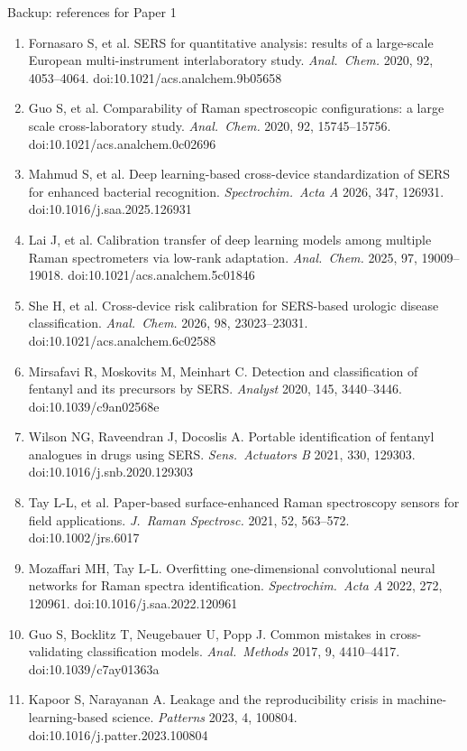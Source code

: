 \documentclass[aspectratio=169,10pt]{beamer}
\begin{document}
\begin{frame}{Backup: references for Paper 1}
\tiny
\begin{enumerate}\setlength{\itemsep}{0pt}
  \item Fornasaro S, et al. SERS for quantitative analysis: results of a large-scale European multi-instrument interlaboratory study. \emph{Anal.\ Chem.} 2020, 92, 4053--4064. doi:10.1021/acs.analchem.9b05658
  \item Guo S, et al. Comparability of Raman spectroscopic configurations: a large scale cross-laboratory study. \emph{Anal.\ Chem.} 2020, 92, 15745--15756. doi:10.1021/acs.analchem.0c02696
  \item Mahmud S, et al. Deep learning-based cross-device standardization of SERS for enhanced bacterial recognition. \emph{Spectrochim.\ Acta A} 2026, 347, 126931. doi:10.1016/j.saa.2025.126931
  \item Lai J, et al. Calibration transfer of deep learning models among multiple Raman spectrometers via low-rank adaptation. \emph{Anal.\ Chem.} 2025, 97, 19009--19018. doi:10.1021/acs.analchem.5c01846
  \item She H, et al. Cross-device risk calibration for SERS-based urologic disease classification. \emph{Anal.\ Chem.} 2026, 98, 23023--23031. doi:10.1021/acs.analchem.6c02588
  \item Mirsafavi R, Moskovits M, Meinhart C. Detection and classification of fentanyl and its precursors by SERS. \emph{Analyst} 2020, 145, 3440--3446. doi:10.1039/c9an02568e
  \item Wilson NG, Raveendran J, Docoslis A. Portable identification of fentanyl analogues in drugs using SERS. \emph{Sens.\ Actuators B} 2021, 330, 129303. doi:10.1016/j.snb.2020.129303
  \item Tay L-L, et al. Paper-based surface-enhanced Raman spectroscopy sensors for field applications. \emph{J.\ Raman Spectrosc.} 2021, 52, 563--572. doi:10.1002/jrs.6017
  \item Mozaffari MH, Tay L-L. Overfitting one-dimensional convolutional neural networks for Raman spectra identification. \emph{Spectrochim.\ Acta A} 2022, 272, 120961. doi:10.1016/j.saa.2022.120961
  \item Guo S, Bocklitz T, Neugebauer U, Popp J. Common mistakes in cross-validating classification models. \emph{Anal.\ Methods} 2017, 9, 4410--4417. doi:10.1039/c7ay01363a
  \item Kapoor S, Narayanan A. Leakage and the reproducibility crisis in machine-learning-based science. \emph{Patterns} 2023, 4, 100804. doi:10.1016/j.patter.2023.100804

\end{enumerate}
\end{frame}
\end{document}
